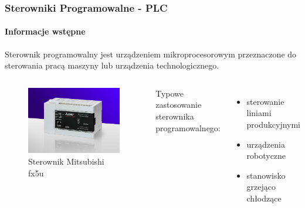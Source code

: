 \documentclass[aspectratio=169]{beamer}
\begin{document}
\begin{frame}
\frametitle{Sterowniki Programowalne - PLC}
\framesubtitle{Informacje wstępne}

Sterownik programowalny jest urządzeniem mikroprocesorowym przeznaczone do sterowania pracą maszyny lub urządzenia technologicznego.
\newline
\begin{columns}

\begin{figure}
	\includegraphics[width=\linewidth]{Rysunki/PLC.png}
	\caption {Sterownik Mitsubishi fx5u}
\end{figure}

Typowe zastosowanie sterownika programowalnego:

\begin{itemize}
  \item sterowanie liniami produkcyjnymi
  \item urządzenia robotyczne
  \item stanowisko grzejąco chłodzące
\end{itemize}


\end{columns}

\end{frame}
\end{document}
